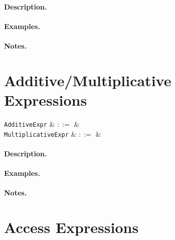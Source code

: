 \paragraph{Description.}

\paragraph{Examples.}

\paragraph{Notes.} 


\section{Additive/Multiplicative Expressions}
\label{c_expr_addmul}

\begin{syntax}
  \verb+AdditiveExpr+ & $::=$ &\\
  \verb+MultiplicativeExpr+ & $::=$ &\\
\end{syntax}

\paragraph{Description.}

\paragraph{Examples.}

\paragraph{Notes.} 


\section{Access Expressions}
\label{c_expr_access}

